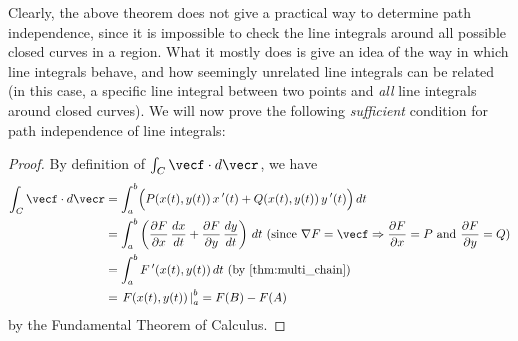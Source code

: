 Clearly, the above theorem does not give a practical way to determine path independence, since it is impossible to check the line integrals around all possible closed curves in a region. What it mostly does is give an idea of the way in which line integrals behave, and how seemingly unrelated line integrals can be related (in this case, a specific line integral between two points and \emph{all} line integrals around closed curves).
%
%
%
We will now prove the following \emph{sufficient} condition for path independence of line integrals:


\begin{proof}
 By definition of $\int_{C}\vecf\cdot d\vecr$, we have
 \begin{align*}
  \int_{C}\vecf\cdot d\vecr
  &= \int_a^b \Bigl( P(x(t),y(t))\,x\,'(t) + Q(x(t),y(t))\,y\,'(t) \Bigr)\,dt\\
  &= \int_a^b \left( \frac{\partial F}{\partial x}\,\frac{dx}{dt} + \frac{\partial F}{\partial y}\,\frac{dy}{dt}
   \right)\,dt \text{ (since $\nabla F = \vecf \Rightarrow \frac{\partial F}{\partial x} = P$ and
  $\frac{\partial F}{\partial y} = Q$)}\\
  &= \int_a^b F\,'(x(t),y(t))\,dt \text{ (by \autoref{thm:multi_chain})}\\
  &= \left.F(x(t),y(t)) \,\right|_a^b = F(B) - F(A)
 \end{align*}
 by the Fundamental Theorem of Calculus.
\end{proof}

